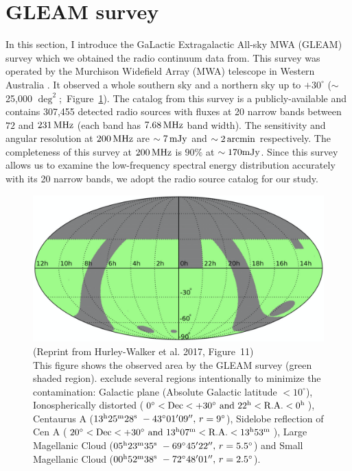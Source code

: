 \section{GLEAM survey}\label{sec:gleamsurvey}

In this section, I introduce the GaLactic Extragalactic All-sky MWA (GLEAM) survey \citep{Hurley-Walker2017a} which we obtained the radio continuum data from.
This survey was operated by the Murchison Widefield Array (MWA) telescope in Western Australia \citep{Tingay2013a}.
It observed a whole southern sky and a northern sky up to $+30^{\circ}$ ($\sim$25,000 $\mathrm{\deg}^2$;~Figure~\ref{fig:HurleyWalker2017_figure11}).
The catalog from this survey is a publicly-available and contains 307,455 detected radio sources with fluxes at 20 narrow bands between $72$ and $231\,\mathrm{MHz}$ (each band has $7.68\,\mathrm{MHz}$ band width).
The sensitivity and angular resolution at $200\,\mathrm{MHz}$ are $\sim 7\,\mathrm{mJy}$ and $\sim 2\,\mathrm{arcmin}$ respectively.
The completeness of this survey at $200\,\mathrm{MHz}$ is $90\%$ at $\sim 170\mathrm{mJy}$.
Since this survey allows us to examine the low-frequency spectral energy distribution accurately with its 20 narrow bands, we adopt the radio source catalog for our study.

\begin{figure}[htbp]
	\centering
	\includegraphics[width=.7\linewidth]{Chapter_3/Figures/HurleyWalker_Figure11.png}
    \caption[Reprint from Hurley-Walker et al. 2017 (Figure~11)]{\label{fig:HurleyWalker2017_figure11}
        (Reprint from Hurley-Walker et al. 2017, Figure~11)\\
        This figure shows the observed area by the GLEAM survey (green shaded region).
        \citet{Hurley-Walker2017a} exclude several regions intentionally to minimize the contamination:
        Galactic plane (Absolute Galactic latitude $<10^{\circ}$),
        Ionospherically distorted ($0^{\circ} < \mathrm{Dec} < +30^{\circ}\ \mathrm{and}\ 22^{\mathrm{h}} < \mathrm{R.A.} < 0^{\mathrm{h}}$),
        Centaurus A ($13\msu{h}25\msu{m}28\msu{s}\ -43^{\circ}01'09'',\,r=9^{\circ}$),
        Sidelobe reflection of Cen A ($20^{\circ} < \mr{Dec} < +30^{\circ}\ \mr{and}\ 13\msu{h}07\msu{m} < \mr{R.A.} < 13\msu{h}53\msu{m}$),
        Large Magellanic Cloud ($05\msu{h}23\msu{m}35\msu{s}\ -69^{\circ}45'22'',\,r=5.5^{\circ}$) and Small Magellanic Cloud ($00\msu{h}52\msu{m}38\msu{s}\ -72^{\circ}48'01'',\,r=2.5^{\circ}$).
    }
\end{figure}






%
%
